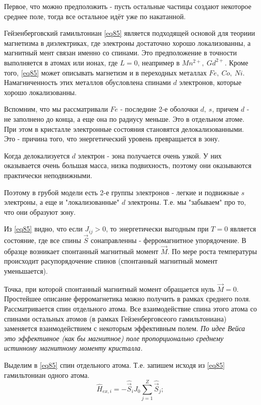 \documentclass[a4paper, 14pt, russian]{article}
\newcommand{\be}{\begin{equation}}
\newcommand{\ee}{\end{equation}}
\begin{document}
	Первое, что можно предположить - пусть остальные частицы создают некоторое 
	среднее поле, тогда все остальное идёт уже по накатанной.

	Гейзенберговский гамильтониан \ref{eq85} является подходящей основой для теориии
	магнетизма в диэлектриках, где электроны достаточно хорошо локализованны, а 
	магнитный мент связан именно со спинами. Это предположение в точности выполняется
	в атомах или ионах, где $L=0$, неапример в $Mn^{2+},~Gd^{2+}$. Кроме того,
	\ref{eq85} может описывать магнетизм и в переходных металлах $Fe,~Co,~Ni$. 
	Намагниченность этих металлов обусловлена спинами $d$ электронов, которые хорошо
	локализованны.
	
	Вспомним, что мы рассматривали $Fe$ - последние 2-е оболочки $d,~s$, причем $d$ - 
	не заполнено до конца, а еще она по радиусу меньше. Это в отдельном атоме.
	При этом в кристалле электронные состояния становятся делокализованными.
	Это - причина того, что энергетический уровень превращается в зону.

	Когда делокализуется $d$ электрон - зона получается очень узкой. У них
	оказывается очень большая масса, низка подвихность, поэтому они оказываются
	практически неподвижными.

	Поэтому в грубой модели есть 2-е группы электронов - легкие и подвижные $s$
	электроны, а еще и "локализованные" $d$ электроны. Т.е. мы "забываем" про то, что
	они образуют зону.

	Из \ref{eq85} видно, что если $J_{ij} >0$, то энергетически выгодным при $T = 0$
	является состояние, где все спины $\vec S$ сонаправленны - ферромагнитное упорядочение.
	В образце возникает спонтанный магнитный момент $\vec M$. По мере роста температуры
	происходит расупорядочение спинов (спонтанный магнитный момент уменьшается).

	Точка, при которой спонтанный магнитный момент обращается нуль $\vec M = 0$.
	Простейшее описание ферромагнетика можно получить в рамках среднего поля. 
	Рассматривается спин отдельного атома. Все взаимодействие спина этого атома со спинами
	остальных атомов (в рамках Гейзенберговсеого гамильтониана) заменяется взаимодействием
	с некоторым эффективным полем. \textit{По идее Вейса это эффективное (как бы магнитное) поле пропорционально среднему истинному
	магнитному моменту кристалла.}

	Выделим в \ref{eq85} спин отдельного атома. Т.е. запишем исходя из \ref{eq85}
	гамильтониан одного атома.
	\be
		\label{eq93}
		\hat{H}_{ex,i} = - \hat{\vec S}_i J_0 \sum_{j = 1}^Z \hat{\vec S}_j;
	\ee
\end{document}
